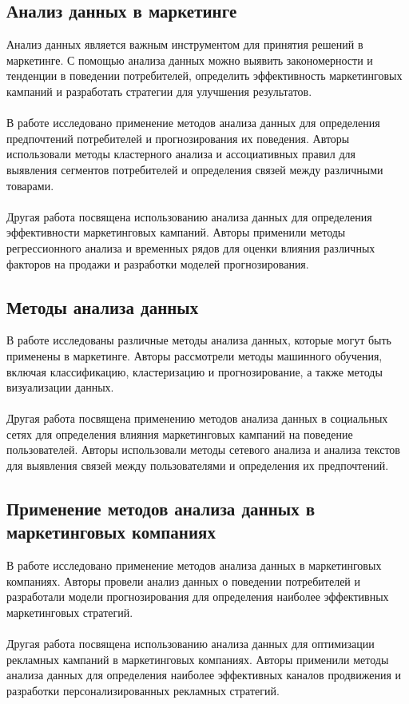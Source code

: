\documentclass{article}
\begin{document}
\subsection{Анализ данных в маркетинге}
Анализ данных является важным инструментом для принятия решений в маркетинге. С помощью анализа данных можно выявить закономерности и тенденции в поведении потребителей, определить эффективность маркетинговых кампаний и разработать стратегии для улучшения результатов.\\
~\\
В работе \cite{ref1} исследовано применение методов анализа данных для определения предпочтений потребителей и прогнозирования их поведения. Авторы использовали методы кластерного анализа и ассоциативных правил для выявления сегментов потребителей и определения связей между различными товарами.\\
~\\
Другая работа \cite{ref2} посвящена использованию анализа данных для определения эффективности маркетинговых кампаний. Авторы применили методы регрессионного анализа и временных рядов для оценки влияния различных факторов на продажи и разработки моделей прогнозирования.
\subsection{Методы анализа данных}
В работе \cite{ref3} исследованы различные методы анализа данных, которые могут быть применены в маркетинге. Авторы рассмотрели методы машинного обучения, включая классификацию, кластеризацию и прогнозирование, а также методы визуализации данных.\\
~\\
Другая работа \cite{ref4} посвящена применению методов анализа данных в социальных сетях для определения влияния маркетинговых кампаний на поведение пользователей. Авторы использовали методы сетевого анализа и анализа текстов для выявления связей между пользователями и определения их предпочтений.
\subsection{Применение методов анализа данных в маркетинговых компаниях}
В работе \cite{ref5} исследовано применение методов анализа данных в маркетинговых компаниях. Авторы провели анализ данных о поведении потребителей и разработали модели прогнозирования для определения наиболее эффективных маркетинговых стратегий.\\
~\\
Другая работа \cite{ref6} посвящена использованию анализа данных для оптимизации рекламных кампаний в маркетинговых компаниях. Авторы применили методы анализа данных для определения наиболее эффективных каналов продвижения и разработки персонализированных рекламных стратегий.
\end{document}
